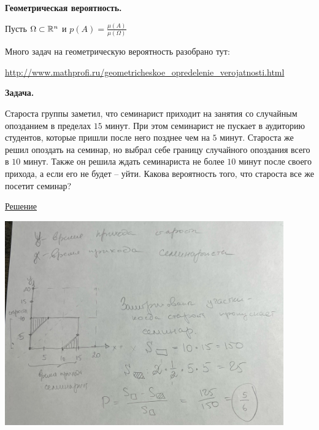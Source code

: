 \Def \textbf{Геометрическая вероятность.}

Пусть $\Omega \subset \mathbb{R}^n$ и $p(A) = \frac{\mu(A)}{\mu(\Omega)}$

Много задач на геометрическую вероятность разобрано тут:

\url{http://www.mathprofi.ru/geometricheskoe_opredelenie_verojatnosti.html}

\textbf{Задача.}

Староста группы заметил, что семинарист приходит на занятия со случайным опозданием в пределах $15$ минут. При этом семинарист не пускает в аудиторию студентов, которые пришли после него позднее чем на $5$ минут. Староста же решил опоздать на семинар, но выбрал себе границу случайного опоздания всего в $10$ минут. Также он решила ждать семинариста не более $10$ минут после своего прихода, а если его не будет -- уйти. Какова вероятность того, что староста все же посетит семинар?

\underline{Решение}

\includegraphics[width=12cm]{images/jetminded_solution.jpeg}